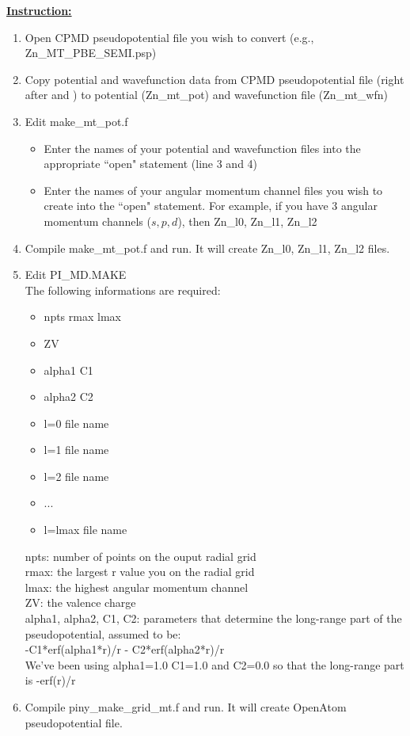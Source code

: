 \vskip 12pt
\noindent
\underline{ {\bf Instruction:} }

\begin{enumerate}
\item Open CPMD pseudopotential file you wish to convert (e.g., Zn\_MT\_PBE\_SEMI.psp)
\item  Copy potential and wavefunction data from CPMD pseudopotential file (right after {\selectfont{\&POTENTIAL}} and {\selectfont{\&WAVEFUNCTION}}) to potential (Zn{\_}mt{\_}pot) and wavefunction file (Zn\_mt\_wfn)
\item Edit make{\_}mt{\_}pot.f

        \begin{itemize}
	\item Enter the names of your potential and wavefunction files into the appropriate ``open" statement (line 3 and 4)
	\item Enter the names of your angular momentum channel files  you wish to create into the ``open" statement. 
	For example, if you have 3 angular momentum channels ($s, p, d$), then Zn{\_}l0, Zn{\_}l1, Zn{\_}l2
         \end{itemize}

\item Compile make{\_}mt{\_}pot.f and run. It will create Zn{\_}l0, Zn{\_}l1, Zn{\_}l2 files.

\item Edit PI{\_}MD.MAKE\\ The following informations are required:

	\begin{itemize}
	\item npts rmax lmax
	\item ZV
	\item alpha1 C1
	\item alpha2 C2
	\item l=0 file name 
	\item l=1 file name 
	\item l=2 file name 
	\item...
	\item l=lmax file name
	\end{itemize}
	
	npts: number of points on the ouput radial grid\\
	rmax: the largest r value you on the radial grid\\
	lmax: the highest angular momentum channel\\
	ZV: the valence charge\\
	alpha1, alpha2, C1, C2: parameters that determine the long-range part of the pseudopotential, assumed to be:\\
	
	-C1*erf(alpha1*r)/r - C2*erf(alpha2*r)/r\\
	
	We've been using alpha1=1.0 C1=1.0 and C2=0.0 so that the long-range part is -erf(r)/r

\item Compile piny{\_}make{\_}grid{\_}mt.f and run. It will create OpenAtom pseudopotential file.
\end{enumerate}



